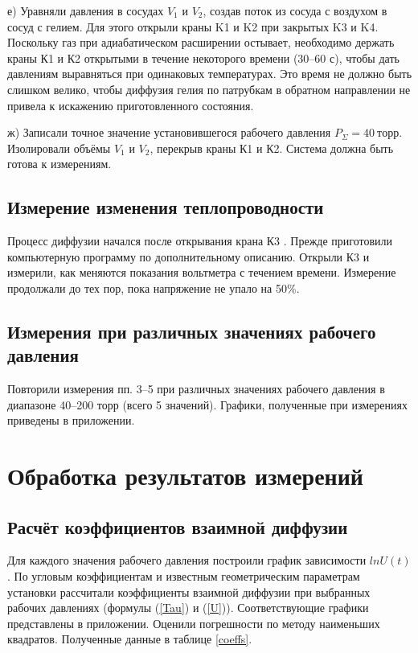 \documentclass[a4paper, 12pt]{article}
\begin{document}
        е) Уравняли давления в сосудах $V_1$ и $V_2$, создав поток из сосуда с воздухом в сосуд с гелием. Для этого открыли краны K1 и K2 при закрытых K3 и K4. Поскольку газ при адиабатическом расширении остывает, необходимо держать краны К1 и К2 открытыми в течение некоторого времени (30–60 с), чтобы дать давлениям выравняться при одинаковых температурах. Это время не должно быть слишком велико, чтобы диффузия гелия по патрубкам в обратном направлении не привела к искажению приготовленного состояния.

        ж) Записали точное значение установившегося рабочего давления $P_{\Sigma} = 40~торр$. Изолировали объёмы $V_1$ и $V_2$, перекрыв краны К1 и К2. Система должна быть готова к измерениям.

    \subsection{Измерение изменения теплопроводности}

        Процесс диффузии начался после открывания крана К3 . Прежде приготовили компьютерную программу по дополнительному описанию. Открыли К3 и измерили, как меняются показания вольтметра с течением времени. Измерение продолжали до тех пор, пока напряжение не упало на 50\%.

    \subsection{Измерения при различных значениях рабочего давления}

        Повторили измерения пп. 3–5 при различных значениях рабочего давления в диапазоне 40–200 торр (всего 5 значений). Графики, полученные при измерениях приведены в приложении.

    \section{Обработка результатов измерений}

    \subsection{Расчёт коэффициентов взаимной диффузии}

        Для каждого значения рабочего давления построили график зависимости $lnU(t)$.  По угловым коэффициентам и известным геометрическим параметрам установки рассчитали коэффициенты взаимной диффузии при выбранных рабочих давлениях (формулы (\ref{Tau}) и (\ref{U})). Соответствующие графики представлены в приложении. Оценили погрешности по методу наименьших квадратов. Полученные данные в таблице \ref{coeffs}.
\end{document}
